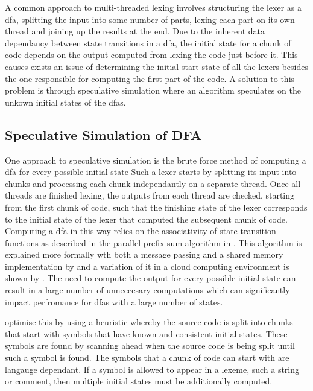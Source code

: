 A common approach to multi-threaded lexing involves structuring the lexer as
a \gls{dfa}, splitting the input into some number of parts, lexing each part on
its own thread and joining up the results at the end. Due to the inherent data
dependancy between state transitions in a \gls{dfa}, the initial state for a
chunk of code depends on the output computed from lexing the code just before
it. This causes exists an issue of determining the initial start state of all
the lexers besides the one responsible for computing the first part of the code.
A solution to this problem is through speculative simulation where an algorithm
speculates on the unkown initial states of the \gls{dfa}s.

\subsection{Speculative Simulation of DFA}

One approach to speculative simulation is the brute force method of computing a
\gls{dfa} for every possible initial state  Such a lexer starts by splitting its
input into chunks and processing each chunk independantly on a separate thread.
Once all threads are finished lexing, the outputs from each thread are checked,
starting from the first chunk of code, such that the finishing state of the
lexer corresponds to the initial state of the lexer that computed the subsequent
chunk of code. Computing a \gls{dfa} in this way relies on the  associativity of
state transition functions as described in the parallel prefix sum algorithm in
\cite{hillis_data_1986}. This algorithm is explained more formally wth both a
message passing and a shared memory implementation by \cite{holub_parallel_2009}
and a variation of it in a cloud computing environment is shown by
\cite{ko_speculative_2012}. The need to compute the output for every possible
initial state can result in a large number of unneccesary computations which can
significantly impact perfromance for \gls{dfa}s with a large number of states.

\cite{barenghi_parallel_2015} optimise this by using a heuristic whereby the
source code is split into chunks that start with symbols that have known and
consistent initial states. These symbols are found by scanning ahead when
the source code is being split until such a symbol is found. The symbols
that a chunk of code can start with are langauge dependant. If a symbol is
allowed to appear in a lexeme, such a string or comment, then multiple initial
states must be additionally computed. 

